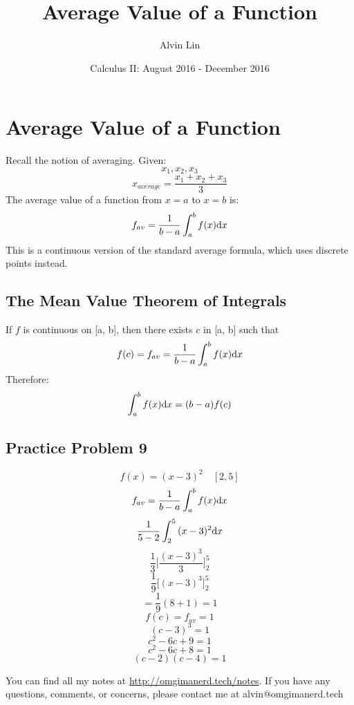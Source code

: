 \documentclass{math}
\title{Average Value of a Function}
\author{Alvin Lin}
\date{Calculus II: August 2016 - December 2016}
\begin{document}
\maketitle

\section*{Average Value of a Function}
Recall the notion of averaging. Given:
\[ x_{1}, x_{2}, x_{3} \]
\[ x_{average} = \frac{x_{1}+x_{2}+x_{3}}{3} \]
The average value of a function from \( x = a \) to \( x = b \) is:
\[ f_{av} = \frac{1}{b-a}\int_{a}^{b}{f(x)\mathrm{d}{x}} \]
This is a continuous version of the standard average formula, which uses
discrete points instead.

\subsection*{The Mean Value Theorem of Integrals}
If \( f \) is continuous on [a, b], then there exists \( c \) in [a, b] such
that
\[ f(c) = f_{av} = \frac{1}{b-a}\int_{a}^{b}{f(x)\mathrm{d}{x}} \]
Therefore:
\[ \int_{a}^{b}{f(x)\mathrm{d}{x}} = (b-a)f(c) \]

\subsection*{Practice Problem 9}
\[ f(x) = (x-3)^{2} \quad [2, 5] \]
\[ f_{av} = \frac{1}{b-a}\int_{a}^{b}{f(x)\mathrm{d}{x}} \]
\[ \frac{1}{5-2}\int_{2}^{5}{(x-3)^{2}\mathrm{d}{x}} \]
\[ \frac{1}{3}\bigg[\frac{(x-3)^{3}}{3}\bigg]_{2}^{5} \]
\[ \frac{1}{9}\bigg[(x-3)^{3}]_{2}^{5} \]
\[ = \frac{1}{9}(8+1) = 1 \]
\[ f(c) = f_{av} = 1 \]
\[ (c-3)^{3} = 1 \]
\[ c^{2}-6c+9 = 1 \]
\[ c^{2}-6c+8 = 1 \]
\[ (c-2)(c-4) = 1 \]

\begin{center}
  You can find all my notes at \url{http://omgimanerd.tech/notes}. If you have
  any questions, comments, or concerns, please contact me at
  alvin@omgimanerd.tech
\end{center}
\end{document}
